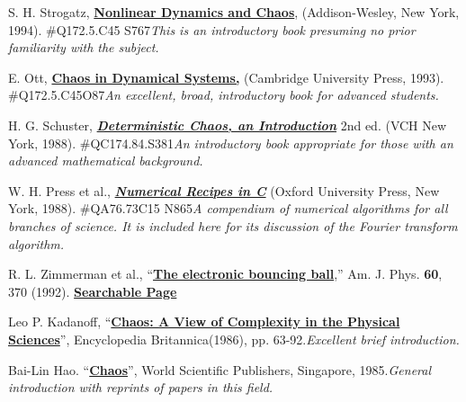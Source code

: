 \documentclass{../lab}
\begin{document}
\begingroup
\renewcommand{\addcontentsline}[3]{}%
\renewcommand{\section}[2]{}%
\begin{thebibliography}{}
     S. H. Strogatz, \href{http://physics111.lib.berkeley.edu/Physics111/Reprints/NLD/Strogatz_Nonlinear_dynamics_n_chaos.pdf}{\textbf{Nonlinear Dynamics and Chaos}}, (Addison-Wesley, New York, 1994). \#Q172.5.C45 S767\emph{This is an introductory book presuming no prior familiarity with the subject.}

     E. Ott, \href{http://ebooks.cambridge.org/ebook.jsf?bid=CBO9780511803260}{\textbf{Chaos in Dynamical Systems,}} (Cambridge University Press, 1993). \#Q172.5.C45O87\emph{An excellent, broad, introductory book for advanced students.}

     H. G. Schuster, \emph{\href{http://physics111.lib.berkeley.edu/Physics111/Reprints/NLD/13-Shannons\_Measure\_of\_Information.pdf}{\textbf{Deterministic Chaos, an Introduction}}} 2nd ed. (VCH New York, 1988). \#QC174.84.S381\emph{An introductory book appropriate for those with an advanced mathematical background.}

     W. H. Press et al., \emph{\href{http://physics111.lib.berkeley.edu/Physics111/Reprints/NLD/11-Fourier\_Transform\_Spectral\_Methods.pdf}{\textbf{Numerical Recipes in C}}} (Oxford University Press, New York, 1988). \#QA76.73C15 N865\emph{A compendium of numerical algorithms for all branches of science. It is included here for its discussion of the Fourier transform algorithm.}

     R. L. Zimmerman et al., ``\href{http://ajp.aapt.org/resource/1/ajpias/v60/i4/p370\_s1}{\textbf{The electronic bouncing ball}},'' Am. J. Phys. \textbf{60}, 370 (1992). \href{http://physics111.lib.berkeley.edu/Physics111/Reprints/NLD/14-Electronic\_Bouncing\_Ball.pdf}{\textbf{Searchable Page}}

     Leo P. Kadanoff, ``\href{http://physics111.lib.berkeley.edu/Physics111/Reprints/NLD/01-Chaos-A\_View\_of\_Complexity.pdf}{\textbf{Chaos: A View of Complexity in the Physical Sciences}}'', Encyclopedia Britannica(1986), pp. 63-92.\emph{Excellent brief introduction.}

     Bai-Lin Hao. ``\href{http://physics111.lib.berkeley.edu/Physics111/Reprints/NLD/02-Chaos.pdf}{\textbf{Chaos}}'', World Scientific Publishers, Singapore, 1985.\emph{General introduction with reprints of papers in this field.}


\end{thebibliography}
\end{document}
